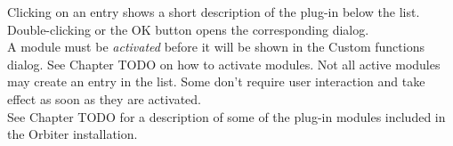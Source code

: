 \documentclass[Orbiter User Manual.tex]{subfiles}
\begin{document}
\begin{figure}[H]
	\centering
\end{figure}

\noindent
Clicking on an entry shows a short description of the plug-in below the list. Double-clicking or the OK button opens the corresponding dialog.\\
A module must be \textit{activated} before it will be shown in the Custom functions dialog. See Chapter TODO on how to activate modules. Not all active modules may create an entry in the list. Some don’t require user interaction and take effect as soon as they are activated.\\
See Chapter TODO for a description of some of the plug-in modules included in the Orbiter installation.
\end{document}
